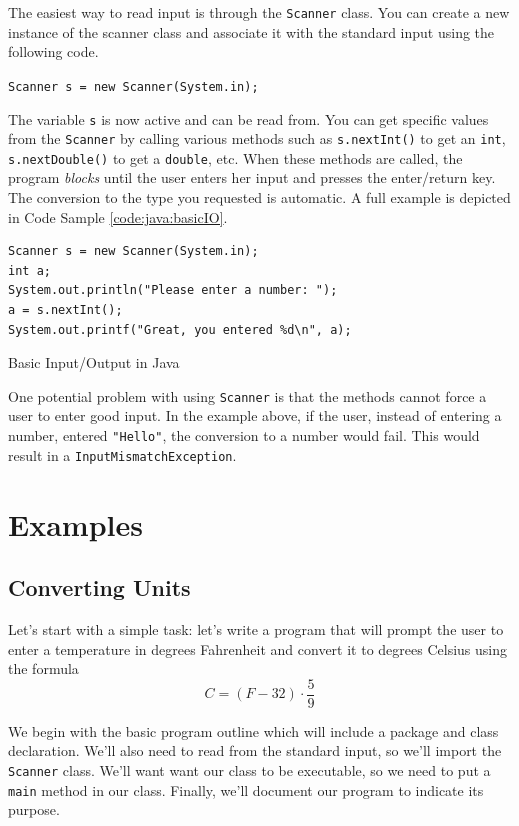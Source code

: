 The easiest way to read input is through the \texttt{Scanner} class.  You can create
a new instance of the scanner class and associate it with the standard input using the following
code.

\texttt{Scanner s = new Scanner(System.in);}

The variable \texttt{s} is now active and can be read from.  You can get specific
values from the \texttt{Scanner} by calling various methods such as \texttt{s.nextInt()}
to get an \texttt{int}, \texttt{s.nextDouble()} to get a \texttt{double}, etc.
When these methods are called, the program \emph{blocks} until the user enters her input
and presses the enter/return key.  The conversion to the type you requested is automatic.
A full example is depicted in Code Sample \ref{code:java:basicIO}.

\begin{listing}
\begin{verbatim}
Scanner s = new Scanner(System.in);
int a;
System.out.println("Please enter a number: ");
a = s.nextInt();
System.out.printf("Great, you entered %d\n", a);
\end{verbatim}
\caption{Basic Input/Output in Java}
\label{code:java:basicIO}
\end{listing}

One potential problem with using \texttt{Scanner} is that the 
methods cannot force a user to enter good input.  In the example above,
if the user, instead of entering a number, entered \texttt{"Hello"}, 
the conversion to a number would fail.  This would result in a 
\texttt{InputMismatchException}.

\section{Examples}

\subsection{Converting Units}

Let's start with a simple task: let's write a program that will prompt 
the user to enter a temperature in degrees Fahrenheit and convert 
it to degrees Celsius using the formula
  $$C = (F - 32) \cdot \frac{5}{9}$$

We begin with the basic program outline which will include a package and
class declaration.  We'll also need
to read from the standard input, so we'll import the \texttt{Scanner}
class.  We'll want want our class to be executable, so we need to 
put a \texttt{main} method in our class.  Finally, we'll document
our program to indicate its purpose.


